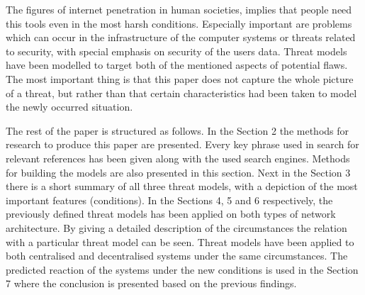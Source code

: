 The figures of internet penetration \cite{web:internetworldstats} in human societies, implies that people need this tools even in the most harsh conditions. Especially important are problems which can occur in the infrastructure of the computer systems or threats related to security, with special emphasis on security of the users data. Threat models have been modelled to target both of the mentioned aspects of potential flaws. The most important thing is that this paper does not capture the whole picture of a threat, but rather than that certain characteristics had been taken to model the newly occurred situation.

The rest of the paper is structured as follows. In the Section 2 the methods for research to produce this paper are presented. Every key phrase used in search for relevant references has been given along with the used search engines. Methods for building the models are also presented in this section. Next in the Section 3 there is a short summary of all three threat models, with a depiction of the most important features (conditions). In the Sections 4, 5 and 6 respectively, the previously defined threat models has been applied on both types of network architecture. By giving a detailed description of the circumstances the relation with a particular threat model can be seen. Threat models have been applied to both centralised and decentralised systems under the same circumstances. The predicted reaction of the systems under the new conditions is used in the Section 7 where the conclusion is presented based on the previous findings.
 

